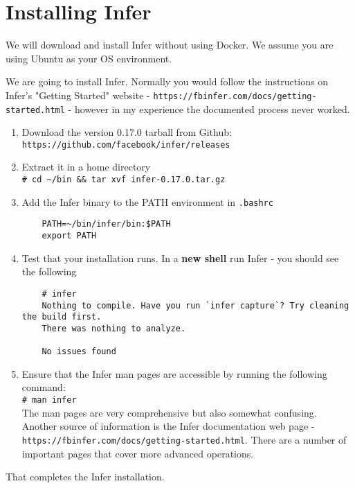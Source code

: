 \appendix

\section{Installing Infer}


We will download and install Infer without using Docker. 
We assume you are using Ubuntu as your OS environment.

We are going to install Infer. Normally you would follow the instructions on Infer's 
"Getting Started" website - \verb|https://fbinfer.com/docs/getting-started.html| - 
however in my experience the documented process never worked.

\begin{enumerate}
	\itemsep0em 
	\item Download the version 0.17.0 tarball from Github:\\
	\verb|https://github.com/facebook/infer/releases|
	\item Extract it in a home directory \\
	\verb|# cd ~/bin && tar xvf infer-0.17.0.tar.gz |
	\item Add the Infer binary to the PATH environment in \verb|.bashrc|
	\begin{verbatim}
	PATH=~/bin/infer/bin:$PATH	
	export PATH
	\end{verbatim}
	\item Test that your installation runs. In a \textbf{new shell} run Infer - you should see the following
	\begin{verbatim}
	# infer
	Nothing to compile. Have you run `infer capture`? Try cleaning the build first.
	There was nothing to analyze.
	
	No issues found 	 
	\end{verbatim}
	\item Ensure that the Infer man pages are accessible by running the following command:\\
	\verb|# man infer|\\
	The man pages are very comprehensive but also somewhat confusing. Another source of
	information is the Infer documentation web page - \verb|https://fbinfer.com/docs/getting-started.html|. There are a number of important pages that cover more advanced operations. \\
\end{enumerate}

That completes the Infer installation. 

